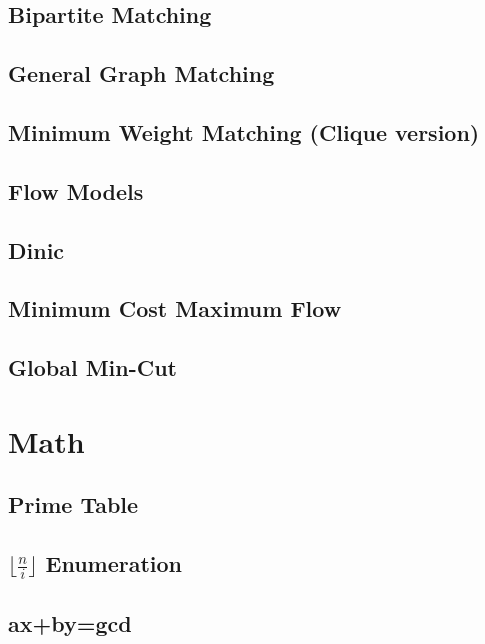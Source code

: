 \documentclass[a4paper,10pt,twocolumn,oneside]{article}
\begin{document}
\subsection{Bipartite Matching}

\subsection{General Graph Matching}

\subsection{Minimum Weight Matching (Clique version)}

\subsection{Flow Models}

\subsection{Dinic}

\subsection{Minimum Cost Maximum Flow}

\subsection{Global Min-Cut}


\section{Math}
\subsection{Prime Table}

\subsection{$\lfloor \frac{n}{i} \rfloor$ Enumeration}

\subsection{ax+by=gcd}

\end{document}
